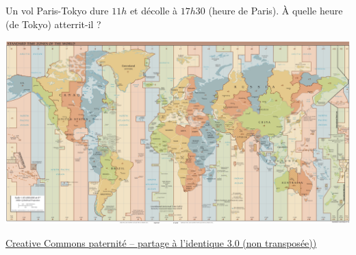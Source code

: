 

\begin{rituel}
    Un vol Paris-Tokyo dure \( 11h\) et décolle à \( 17h30\) (heure de Paris). À quelle heure (de Tokyo) atterrit-il ?


\begin{center}
\includegraphics[width=\linewidth]{TimeZones.pdf}
\end{center}

\vfill
{\small
\href{ http://creativecommons.org/licenses/by-sa/3.0/deed.fr }{Creative Commons paternité – partage à l'identique 3.0 (non transposée))}
}

\end{rituel}
